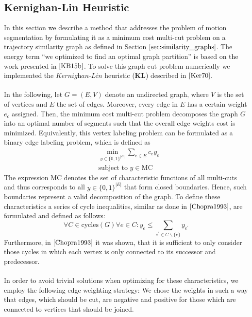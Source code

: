 \subsection{Kernighan-Lin Heuristic}
\label{sec:kl_impl}
In this section we describe a method that addresses the problem of motion segmentation by formulating it as a minimum cost multi-cut problem on a trajectory similarity graph as defined in Section $\ref{sec:similarity_graphs}$. The energy term \enquote{we optimized to find an optimal graph partition} is based on the work presented in $\cite{KB15b}$. To solve this graph cut problem numerically we implemented the $\textit{Kernighan-Lin}$ heuristic ($\textbf{KL}$) described in $\cite{Ker70}$. \\ \\
In the following, let $G = (E, V)$ denote an undirected graph, where $V$ is the set of vertices and $E$ the set of edges. Moreover, every edge in $E$ has a certain weight $e_c$ assigned. Then, the minimum cost multi-cut problem decomposes the graph $G$ into an optimal number of segments such that the overall edge weights cost is minimized. Equivalently, this vertex labeling problem can be formulated as a binary edge labeling problem, which is defined as
\begin{equation}
\begin{aligned}
& \min_{y \in \{0,1 \}^{|E|}} \sum_{e \in E} c_e y_e \\
& \text{subject to } y \in \text{MC}
\end{aligned}
\end{equation}
The expression $\text{MC}$ denotes the set of characteristic functions of all multi-cuts and thus corresponds to all $y \in \{0,1 \}^{|E|}$ that form closed boundaries. Hence, such boundaries represent a valid decomposition of the graph. To define these characteristics a series of cycle inequalities, similar as done in $\cite{Chopra1993}$, are formulated and defined as follows:
\begin{equation}
	\forall C \in \text{cycles}(G) \forall e \in C: y_e \leq \sum_{e^{'} \in C \backslash \{e\}} y_{e^{'}}
\end{equation}
Furthermore, in $\cite{Chopra1993}$ it was shown, that it is sufficient to only consider those cycles in which each vertex is only connected to its successor and predecessor. \\ \\
In order to avoid trivial solutions when optimizing for these characteristics, we employ the following edge weighting strategy: We chose the weights in such a way that edges, which should be cut, are negative and positive for those which are connected to vertices that should be joined.
